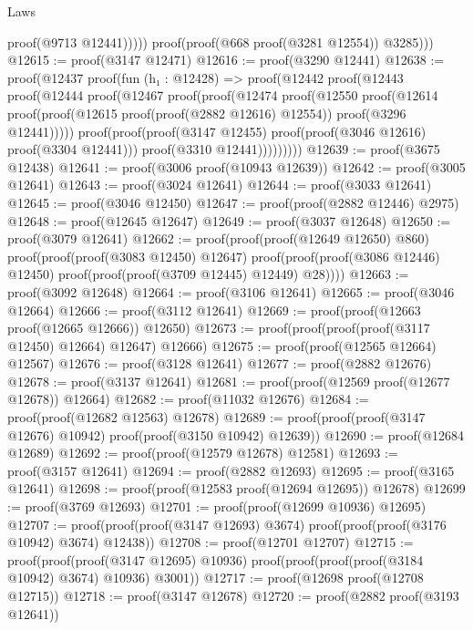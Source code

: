 \begin{lexlean}{Laws}
\begin{coremodule}
                        proof(@9713 @12441)))))
          proof(proof(@668 proof(@3281 @12554)) @3285)))
@12615 := proof(@3147 @12471)
@12616 := proof(@3290 @12441)
@12638 := proof(@12437
      proof(fun (h₁ : @12428) =>
        proof(@12442
            proof(@12443
                proof(@12444
                    proof(@12467
                        proof(proof(@12474
                              proof(@12550
                                  proof(@12614
                                      proof(proof(@12615 proof(proof(@2882 @12616) @12554))
                                          proof(@3296 @12441)))))
                            proof(proof(proof(@3147 @12455)
                                  proof(proof(@3046 @12616) proof(@3304 @12441)))
                                proof(@3310 @12441)))))))))
@12639 := proof(@3675 @12438)
@12641 := proof(@3006 proof(@10943 @12639))
@12642 := proof(@3005 @12641)
@12643 := proof(@3024 @12641)
@12644 := proof(@3033 @12641)
@12645 := proof(@3046 @12450)
@12647 := proof(proof(@2882 @12446) @2975)
@12648 := proof(@12645 @12647)
@12649 := proof(@3037 @12648)
@12650 := proof(@3079 @12641)
@12662 := proof(proof(proof(@12649 @12650) @860)
      proof(proof(proof(@3083 @12450) @12647)
          proof(proof(proof(@3086 @12446) @12450) proof(proof(proof(@3709 @12445) @12449) @28))))
@12663 := proof(@3092 @12648)
@12664 := proof(@3106 @12641)
@12665 := proof(@3046 @12664)
@12666 := proof(@3112 @12641)
@12669 := proof(proof(@12663 proof(@12665 @12666)) @12650)
@12673 := proof(proof(proof(proof(@3117 @12450) @12664) @12647) @12666)
@12675 := proof(proof(@12565 @12664) @12567)
@12676 := proof(@3128 @12641)
@12677 := proof(@2882 @12676)
@12678 := proof(@3137 @12641)
@12681 := proof(proof(@12569 proof(@12677 @12678)) @12664)
@12682 := proof(@11032 @12676)
@12684 := proof(proof(@12682 @12563) @12678)
@12689 := proof(proof(proof(@3147 @12676) @10942) proof(proof(@3150 @10942) @12639))
@12690 := proof(@12684 @12689)
@12692 := proof(proof(@12579 @12678) @12581)
@12693 := proof(@3157 @12641)
@12694 := proof(@2882 @12693)
@12695 := proof(@3165 @12641)
@12698 := proof(proof(@12583 proof(@12694 @12695)) @12678)
@12699 := proof(@3769 @12693)
@12701 := proof(proof(@12699 @10936) @12695)
@12707 := proof(proof(proof(@3147 @12693) @3674) proof(proof(proof(@3176 @10942) @3674) @12438))
@12708 := proof(@12701 @12707)
@12715 := proof(proof(proof(@3147 @12695) @10936)
      proof(proof(proof(proof(@3184 @10942) @3674) @10936) @3001))
@12717 := proof(@12698 proof(@12708 @12715))
@12718 := proof(@3147 @12678)
@12720 := proof(@2882 proof(@3193 @12641))

\end{coremodule}
\end{lexlean}
